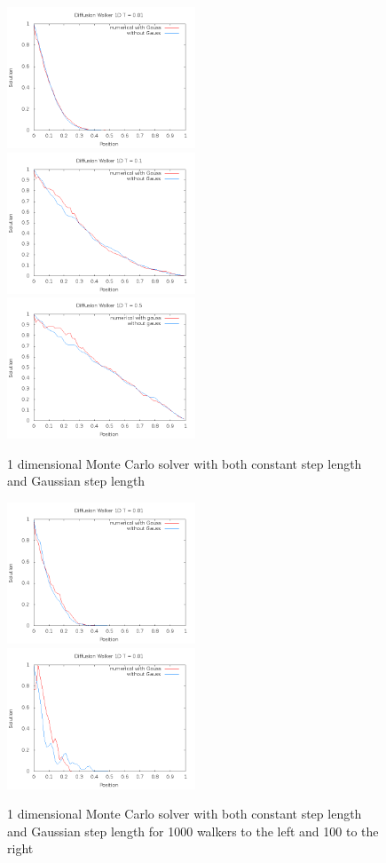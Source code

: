 \documentclass[a4wide,12pt]{article}
\begin{document}
\begin{figure}[p]
 \includegraphics[width=0.5\textwidth]{diff1dt001sm}
 \includegraphics[width=0.5\textwidth]{diff1dt01sm}
 \includegraphics[width=0.5\textwidth]{diff1dt05sm}
 \caption{1 dimensional Monte Carlo solver with both constant step length and Gaussian step length}
 \label{fig:05}
\end{figure}

\begin{figure}[p]
 \includegraphics[width=0.5\textwidth]{walk1000}
 \includegraphics[width=0.5\textwidth]{walk100}
 \caption{1 dimensional Monte Carlo solver with both constant step length and Gaussian step length for 1000 walkers to the left and 100 to the right}
 \label{fig:06}
\end{figure}
\end{document}

